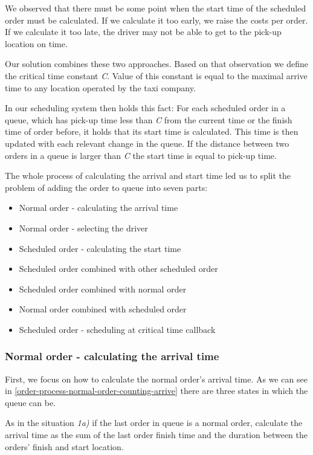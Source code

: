 We observed that there must be some point when the start time of the scheduled order must be calculated. If we calculate it too early, we raise the costs per order. If we calculate it too late, the driver may not be able to get to the pick-up location on time. 

Our solution combines these two approaches. Based on that observation we define the critical time constant \textit{C}. Value of this constant is equal to the maximal arrive time to any location operated by the taxi company. 

In our scheduling system then holds this fact: For each scheduled order in a queue, which has pick-up time less than \textit{C} from the current time or the finish time of order before, it holds that its start time is calculated. This time is then updated with each relevant change in the queue. If the distance between two orders in a queue is larger than \textit{C} the start time is equal to pick-up time.

The whole process of calculating the arrival and start time led us to split the problem of adding the order to queue into seven parts:
\begin{itemize}
	\item Normal order - calculating the arrival time
	\item Normal order - selecting the driver
	\item Scheduled order - calculating the start time
	\item Scheduled order combined with other scheduled order
	\item Scheduled order combined with normal order
	\item Normal order combined with scheduled order
	\item Scheduled order - scheduling at critical time callback 
\end{itemize}

	\subsubsection{Normal order - calculating the arrival time}
	
	First, we focus on how to calculate the normal order's arrival time. As we can see in \ref{order-process-normal-order-counting-arrive} there are three states in which the queue can be.
	
	As in the situation \textit{1a)} if the last order in queue is a normal order, calculate the arrival time as the sum of the last order finish time and the duration between the orders' finish and start location.
	
